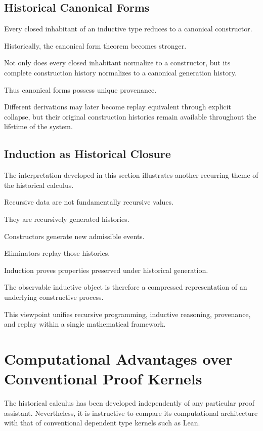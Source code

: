 \documentclass[12pt,oneside]{article}
\theoremstyle{definition}
\theoremstyle{remark}
\begin{document}
\subsection{Historical Canonical Forms}

Every closed inhabitant of an inductive type reduces to a canonical constructor.

Historically, the canonical form theorem becomes stronger.

Not only does every closed inhabitant normalize to a constructor, but its
complete construction history normalizes to a canonical generation history.

Thus canonical forms possess unique provenance.

Different derivations may later become replay equivalent through explicit
collapse, but their original construction histories remain available throughout
the lifetime of the system.

\subsection{Induction as Historical Closure}

The interpretation developed in this section illustrates another recurring theme
of the historical calculus.

Recursive data are not fundamentally recursive values.

They are recursively generated histories.

Constructors generate new admissible events.

Eliminators replay those histories.

Induction proves properties preserved under historical generation.

The observable inductive object is therefore a compressed representation of an
underlying constructive process.

This viewpoint unifies recursive programming, inductive reasoning, provenance,
and replay within a single mathematical framework.

\section{Computational Advantages over Conventional Proof Kernels}

The historical calculus has been developed independently of any particular proof
assistant. Nevertheless, it is instructive to compare its computational
architecture with that of conventional dependent type kernels such as Lean.
\end{document}
